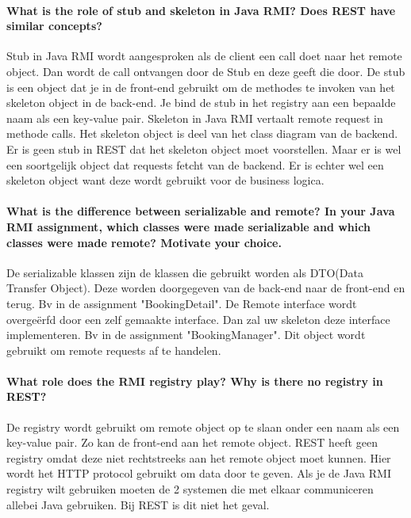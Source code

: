 \documentclass{ds-report}
\begin{document}
	\maketitle

	\paragraph{What is the role of stub and skeleton in Java RMI? Does REST have similar concepts?} 
	Stub in Java RMI wordt aangesproken als de client een call doet naar het remote object. Dan wordt de call ontvangen door de Stub en deze geeft die door. De stub is een object dat je in de front-end gebruikt om de methodes te invoken van het skeleton object in de back-end. Je bind de stub in het registry aan een bepaalde naam als een key-value pair.
    Skeleton in Java RMI vertaalt remote request in methode calls. Het skeleton object is deel van het class diagram van de backend. 
    Er is geen stub in REST dat het skeleton object moet voorstellen. Maar er is wel een soortgelijk object dat requests fetcht van de backend. Er is echter wel een skeleton object want deze wordt gebruikt voor de business logica.
	
	\paragraph{What is the difference between serializable and remote? In your Java RMI assignment, which classes were made serializable and which classes were made remote? Motivate your choice.} 
    De serializable klassen zijn de klassen die gebruikt worden als DTO(Data Transfer Object). Deze worden doorgegeven van de back-end naar de front-end en terug. Bv in de assignment "BookingDetail". De Remote interface wordt overgeërfd door een zelf gemaakte interface. Dan zal uw skeleton deze interface implementeren. Bv in de assignment "BookingManager". Dit object wordt gebruikt om remote requests af te handelen.

    \paragraph{What role does the RMI registry play? Why is there no registry in REST?}
    De registry wordt gebruikt om remote object op te slaan onder een naam als een key-value pair. Zo kan de front-end aan het remote object. REST heeft geen registry omdat deze niet rechtstreeks aan het remote object moet kunnen. Hier wordt het HTTP protocol gebruikt om data door te geven. Als je de Java RMI registry wilt gebruiken moeten de 2 systemen die met elkaar communiceren allebei Java gebruiken. Bij REST is dit niet het geval.
\end{document}
